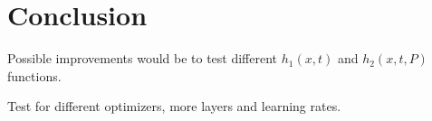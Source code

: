 \section{Conclusion}


Possible improvements would be to test different $h_1(x,t)$ and $h_2(x,t,P)$ functions.

Test for different optimizers, more layers and learning rates.